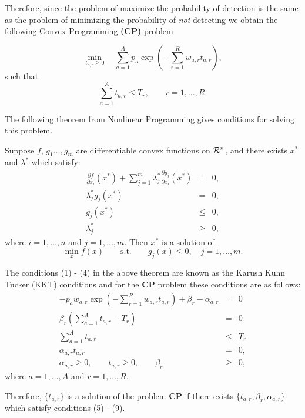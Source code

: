 Therefore, since the problem of maximize the probability of detection
is the same as the problem of minimizing the probability of \emph{not}
detecting we obtain the following Convex Programming {\bf (CP)} problem

$$
\min_{t_{a,r}\ge 0}\quad \sum_{a = 1}^A p_a \exp\left(-\sum_{r = 1}^R
w_{a,r}t_{a,r}\right),
$$
such that
$$
\sum_{a = 1}^A t_{a,r} \le T_r, \qquad r = 1,\ldots,R.
$$

The following theorem from Nonlinear Programming gives conditions for 
solving this problem.

\begin{theorem} Suppose $f$, $g_1\ldots,g_m$ are differentiable convex
functions on ${\cal R}^n$, and there exists $x^*$ and $\lambda^{*}$
which satisfy:
\begin{eqnarray}
\frac{\partial f}{\partial x_i}(x^{*}) + \sum_{j=1}^m \lambda^*_j\frac{\partial
g_j}{\partial x_i}(x^{*}) &=& 0, \\
\lambda^{*}_j g_j(x^{*}) &=& 0, \\
g_j(x^{*}) &\le& 0, \\
\lambda^{*}_j &\ge& 0, 
\end{eqnarray}
where $i = 1,\ldots, n$ and $j = 1,\ldots, m$. Then $x^{*}$ is a solution of
$$
\min_{x} f(x)\qquad\mbox{s.t.}\qquad g_j(x)\le 0,\quad j=1,\ldots,m.
$$

\end{theorem}

The conditions (1) - (4) in the above theorem are known as the Karush
Kuhn Tucker (KKT) conditions and for the {\bf CP} problem these conditions
are as follows:
\begin{eqnarray}
-p_aw_{a,r}\exp(-\sum_{r=1}^R w_{a,r}t_{a,r}) + \beta_r - \alpha_{a,r} &=& 0\\
\beta_r(\sum_{a = 1}^A t_{a,r} - T_r) &=& 0\\
\sum_{a = 1}^A t_{a,r} &\le& T_r\\
\alpha_{a,r}t_{a,r} &=& 0, \\
\alpha_{a,r} \ge 0, \qquad t_{a,r} \ge 0, \qquad \beta_r &\ge& 0,
\end{eqnarray}
where $a = 1,\ldots,A$ and $r =1,\ldots,R$.

Therefore, $\{t_{a,r}\}$ is a solution of the problem {\bf CP} if
there exists $\{t_{a,r}, \beta_r, \alpha_{a,r}\}$ which satisfy
conditions (5) - (9).

